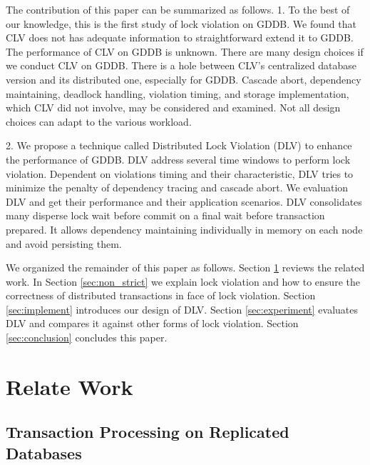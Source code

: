 \documentclass[conference]{IEEEtran}
\begin{document}
The contribution of this paper can be summarized as follows.
1. To the best of our knowledge, this is the first study of lock violation on GDDB.
We found that CLV does not has adequate information
to straightforward extend it to GDDB.
The performance of CLV on GDDB is unknown. 
There are many design choices if we conduct CLV on GDDB.
There is a hole between CLV's centralized database version and its distributed one, especially for GDDB.
Cascade abort, dependency maintaining, deadlock handling, violation timing, and storage implementation, which CLV did not involve, may be considered and examined.
Not all design choices can adapt to the various workload.

2. We propose a technique called Distributed Lock Violation (DLV) to enhance the performance of GDDB.
DLV address several time windows to perform lock violation.
Dependent on violations timing and their characteristic, DLV tries to minimize the penalty of dependency tracing and cascade abort.
We evaluation DLV and get their performance and their application scenarios.
DLV consolidates many disperse lock wait before commit on a final wait before transaction prepared.
It allows dependency maintaining individually in memory on each node and avoid persisting them.

We organized the remainder of this paper as follows.
Section \ref{sec:relate_work} reviews the related work.
In Section \ref{sec:non_strict} we explain lock violation and how to ensure the correctness of distributed transactions in face of lock violation.
Section \ref{sec:implement} introduces our design of DLV.
Section \ref{sec:experiment} evaluates DLV and compares it against other forms of lock violation.
Section \ref{sec:conclusion} concludes this paper.


\section{Relate Work}
\label{sec:relate_work}

\subsection{Transaction Processing on Replicated Databases}
\end{document}
